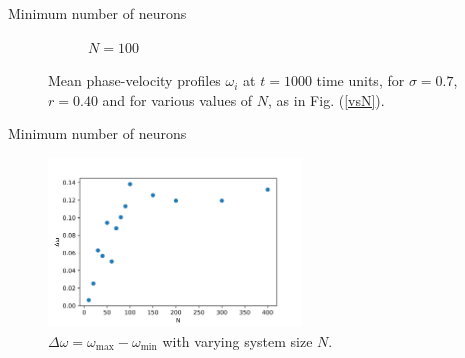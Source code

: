 \documentclass{beamer}
\begin{document}
\begin{frame}{Minimum number of neurons}
\begin{figure}[H]
\begin{subfigure}{.32\textwidth}
  \caption{$N=100$}
\end{subfigure}
\caption{Mean phase-velocity profiles $\omega_i$ at $t=1000$ time units, for $\sigma = 0.7$, $r=0.40$ and for various values of $N$, as in Fig. (\ref{vsN}).}
\label{vsN2}
\end{figure}
\end{frame}

\begin{frame}{Minimum number of neurons}

\begin{figure}[H]
\centering
\includegraphics[width=0.6\textwidth]{deltaw_scatter.png}
\caption{$\Delta \omega = \omega_{\text{max}}-\omega_{\text{min}}$ with varying system size $N$.}
\label{dw}
\end{figure}
\noindent

\end{frame}
\end{document}
